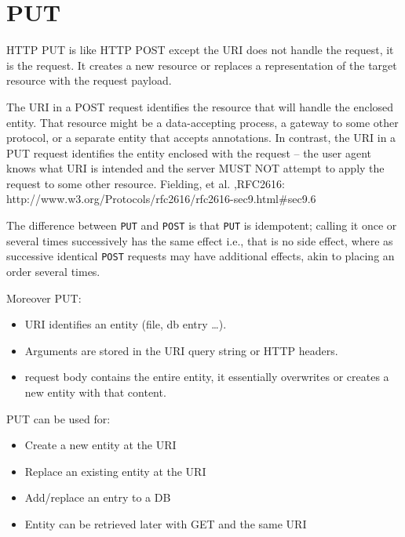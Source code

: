 \documentclass[../CMPUT-404-Notes.tex]{subfiles}
\begin{document}
\section{PUT}
HTTP PUT is like HTTP POST except the URI does not handle the request, it is the request.
It creates a new resource or replaces a representation of the target resource with the request payload. 

\begin{DndReadAloud}[color=bgtan]
  The URI in a POST request identifies the resource that will handle the enclosed entity. That resource might be a data-accepting process, a gateway to some other protocol, or a separate entity that accepts annotations. In contrast, the URI in a PUT request identifies the entity enclosed with the request -- the user agent knows what URI is intended and the server MUST NOT attempt to apply the request to some other resource.
  \newline
Fielding, et al. ,RFC2616: http://www.w3.org/Protocols/rfc2616/rfc2616-sec9.html\#sec9.6
\end{DndReadAloud}

The difference between \texttt{PUT} and \texttt{POST} is that \texttt{PUT} is idempotent; calling it once or several times successively has the same effect i.e., that is no side effect, where as successive identical \texttt{POST} requests may have additional effects, akin to placing an order several times. 

Moreover PUT:
\begin{itemize}
  \item URI identifies an entity (file, db entry \ldots).
  \item Arguments are stored in the URI query string or HTTP headers.
  \item request body contains the entire entity, it essentially overwrites or creates a new entity with that content.
\end{itemize}

PUT can be used for:
\begin{itemize}
  \item Create a new entity at the URI
  \item Replace an existing entity at the URI
  \item Add/replace an entry to a DB
  \item Entity can be retrieved later with GET and the same URI
\end{itemize}
\end{document}
